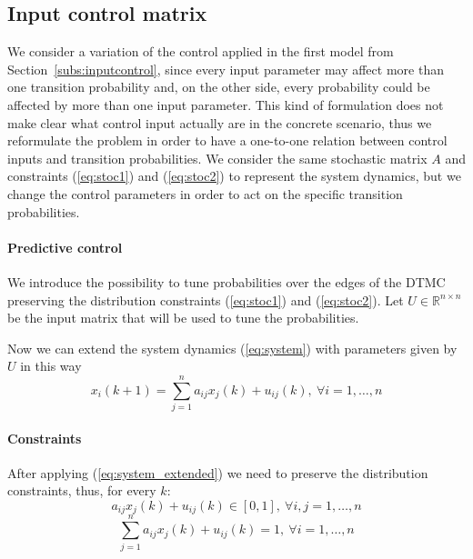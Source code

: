 \documentclass[a4paper, 11pt]{article}
\theoremstyle{definition}
\theoremstyle{remark}
\begin{document}
\subsection{Input control matrix}
We consider a variation of the control applied in the first model from Section~\ref{subs:inputcontrol}, since every input parameter may affect more than one transition probability and, on the other side, every probability could be affected by more than one input parameter. This kind of formulation does not make clear what control input actually are in the concrete scenario, thus we reformulate the problem in order to have a one-to-one relation between control inputs and transition probabilities. We consider the same stochastic matrix $A$ and constraints (\ref{eq:stoc1}) and (\ref{eq:stoc2}) to represent the system dynamics, but we change the control parameters in order to act on the specific transition probabilities.

\paragraph{Predictive control}
We introduce the possibility to tune probabilities over the edges of the DTMC preserving the distribution constraints (\ref{eq:stoc1}) and (\ref{eq:stoc2}). Let $U \in \mathbb{R}^{n\times n}$ be the input matrix that will be used to tune the probabilities.

Now we can extend the system dynamics (\ref{eq:system}) with parameters given by $U$ in this way
\begin{equation} \label{eq:system_extended}
	x_i(k+1) = \sum_{j=1}^n a_{ij} x_j(k) + u_{ij}(k), \ \forall i = 1,\dots,n
\end{equation}

\paragraph{Constraints}
After applying (\ref{eq:system_extended}) we need to preserve the distribution constraints, thus, for every $k$:
\begin{equation}\label{eq:udistr1}
	a_{ij}x_j(k) + u_{ij}(k) \in [0,1],\ \forall i,j = 1,\dots,n
\end{equation}
\begin{equation}\label{eq:udistr2}
	\sum_{j=1}^n a_{ij}x_j(k) + u_{ij}(k) = 1,\ \forall i = 1,\dots,n
\end{equation}
\end{document}

